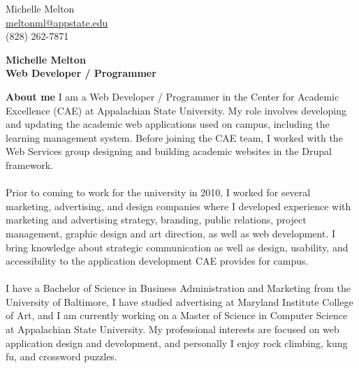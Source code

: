\documentclass[a4paper,12pt,final]{memoir}
\newcommand{\Sep}{\vspace{1.5em}}
\newenvironment{AboutMe}
	{\ignorespaces\textbf{\color{BrickRed} About me}}
	{\Sep\ignorespacesafterend}
\begin{document}
\begin{flushright}\small
	Michelle Melton \\
	\url{meltonml@appstate.edu}  \\
	(828) 262-7871
\end{flushright}\normalsize
\framebreak


\Huge\bfseries {\color{BrickRed} Michelle Melton} \\
\Large\bfseries  Web Developer / Programmer \\

\normalsize\normalfont

\begin{AboutMe}
I am a Web Developer / Programmer in the Center for Academic Excellence (CAE) at Appalachian State University. My role involves developing and updating the academic web applications used on campus, including the learning management system. Before joining the CAE team, I worked with the Web Services group designing and building academic websites in the Drupal framework.\\\\
Prior to coming to work for the university in 2010, I worked for several marketing, advertising, and design companies where I developed experience with marketing and advertising strategy, branding, public relations, project management, graphic design and art direction, as well as web development. I bring knowledge about strategic communication as well as design, usability, and accessibility to the application development CAE provides for campus.\\\\
I have a Bachelor of Science in Business Administration and Marketing from the University of Baltimore, I have studied advertising at Maryland Institute College of Art, and I am currently working on a Master of Science in Computer Science at Appalachian State University. My professional interests are focused on web application design and development, and personally I enjoy rock climbing, kung fu, and crossword puzzles.
\end{AboutMe}
\end{document}
